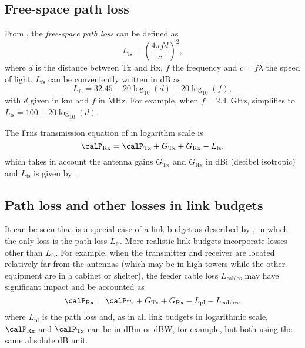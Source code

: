 \subsection{Free-space path loss}

From , the \emph{free-space path loss} can be defined as
\[
L_{\textrm{fs}} = \left( \frac{4 \pi f d}{c} \right)^2,
\]
where $d$ is the distance between Tx and Rx, $f$ the frequency and $c=f \lambda$ the speed of light. $L_{\textrm{fs}}$ can be conveniently written in dB as
\begin{equation}
L_{\textrm{fs}} = 32.45 + 20 \log_{10}(d) + 20 \log_{10}(f),
\label{eq:freeSpacePathLoss}
\end{equation}
with $d$ given in km and $f$ in MHz.
For example, when $f=2.4$~GHz,  simplifies to $L_{\textrm{fs}} = 100+20 \log_{10}(d)$. 

The Friis transmission equation of  in logarithm scale is
\begin{equation}
\calP_{\textrm{Rx}} = \calP_{\textrm{Tx}} + G_{\textrm{Tx}} + G_{\textrm{Rx}} - L_{\textrm{fs}},
\label{eq:friisTransmissionEq}
\end{equation}
which takes in account the antenna gains $G_{\textrm{Tx}}$ and $G_{\textrm{Rx}}$ in dBi (decibel isotropic) and $L_{\textrm{fs}}$ is given by .

\subsection{Path loss and other losses in link budgets}

It can be seen that  is a special case of a link budget
as described by , in which the only loss is the path loss $L_{\textrm{fs}}$.
More realistic link budgets incorporate losses other than $L_{\textrm{fs}}$. 
For example, when the transmitter and receiver are located relatively far from the
antennas (which may be in high towers while the other equipment are in a cabinet or shelter), the feeder cable loss $L_{\text{cables}}$ may have significant impact and be accounted as
\begin{equation}
\calP_{\textrm{Rx}} = \calP_{\textrm{Tx}} + G_{\textrm{Tx}} + G_{\textrm{Rx}} - L_{\textrm{pl}}  - L_{\text{cables}},
\label{eq:realisticLinkBudget}
\end{equation}
where $L_{\textrm{pl}}$ is the path loss and, as in all link budgets in logarithmic scale,
$\calP_{\textrm{Rx}}$ and $\calP_{\textrm{Tx}}$ can be in dBm or dBW, for example, but both using 
the same absolute dB unit. 

